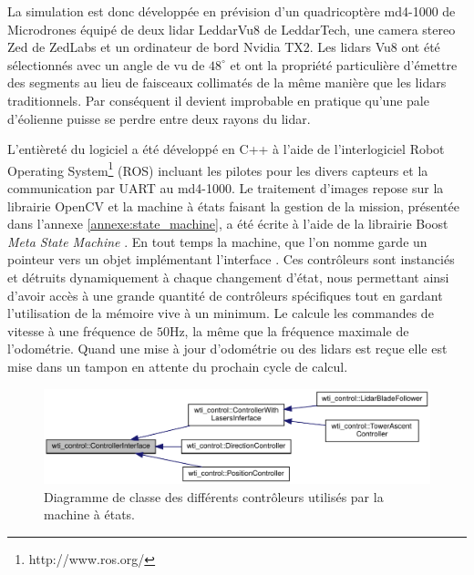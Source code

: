 La simulation est donc développée en prévision d'un quadricoptère md4-1000 de Microdrones équipé de deux lidar LeddarVu8 de LeddarTech, une camera stereo Zed de ZedLabs et un ordinateur de bord Nvidia TX2. Les lidars Vu8 ont été sélectionnés avec un angle de vu de $48^{\circ}$ et ont la propriété particulière d'émettre des segments au lieu de faisceaux collimatés de la même manière que les lidars traditionnels. Par conséquent il devient improbable en pratique qu'une pale d'éolienne puisse se perdre entre deux rayons du lidar.

L'entièreté du logiciel a été développé en C++ à l'aide de l'interlogiciel
Robot Operating System\footnote{http://www.ros.org/} (ROS) incluant les pilotes pour les divers capteurs et la communication par UART au md4-1000. Le traitement d'images repose sur la librairie OpenCV \citep{itseez2015} et la machine à états faisant la gestion de la mission, présentée dans l'annexe \ref{annexe:state_machine}, a été écrite à l'aide de la librairie Boost \textit{Meta State Machine} \citep{Schling2011}. En tout temps la machine, que l'on nomme  garde un pointeur vers un objet implémentant l'interface . Ces contrôleurs sont instanciés et détruits dynamiquement à chaque changement d'état, nous permettant ainsi d'avoir accès à une grande quantité de contrôleurs spécifiques tout en gardant l'utilisation de la mémoire vive à un minimum. Le  calcule les commandes de vitesse à une fréquence de $50$Hz, la même que la fréquence maximale de l'odométrie. Quand une mise à jour d'odométrie ou des lidars est reçue elle est mise dans un tampon en attente du prochain cycle de calcul.

\begin{figure}[htbp]
  \centering
  \includegraphics[width=\linewidth]{images/uml_controller.pdf}
  \caption{Diagramme de classe des différents contrôleurs utilisés par la machine à états.}
  \label{fig:uml_controller}
\end{figure}

